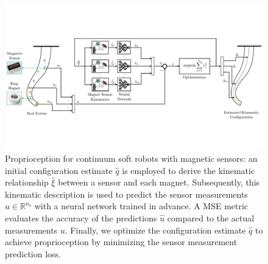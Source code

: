 \begin{figure}[ht]
  \centering
  \includegraphics[width=1.0\textwidth]{promasens/figures/methodology/methodology_proprioception_v8_compressed.pdf}
  \caption{Proprioception for continuum soft robots with magnetic sensors: an initial configuration estimate $\hat{q}$ is employed to derive the kinematic relationship $\hat{\xi}$ between a sensor and each magnet. Subsequently, this kinematic description is used to predict the sensor measurements $\hat{u} \in \mathbb{R}^{n_\mathrm{s}}$ with a neural network trained in advance. A \gls{MSE} metric evaluates the accuracy of the predictions $\hat{u}$ compared to the actual measurements $u$. Finally, we optimize the configuration estimate $\hat{q}$ to achieve proprioception by minimizing the sensor measurement prediction loss.}\label{fig:promasens:methodology}
\end{figure}




